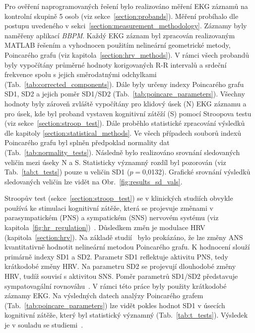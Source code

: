 Pro ověření naprogramovaných řešení bylo realizováno měření EKG záznamů na
kontrolní skupině 5 osob (viz sekce~\ref{section:probands}). Měření probíhalo
dle postupu uvedeného v sekci~\ref{section:measurement_methodology}. Záznamy
byly naměřeny aplikací \textit{BBPM}. Každý EKG záznam byl zpracován
realizovaným MATLAB řešením a vyhodnocen použitím nelineární
geometrické metody, Poincarého grafu (viz kapitola~\ref{section:hrv_methods}). V
rámci všech probandů byly vypočítány průměrné hodnoty korigovaných R-R intervalů
a srdeční frekvence spolu s jejich směrodatnými odchylkami
(Tab.~\ref{tab:corrected_components}). Dále byly určeny indexy Poincarého grafu
SD1, SD2 a jejich poměr SD1/SD2 (Tab.~\ref{tab:poincare_parameters}). Všechny hodnoty byly
zároveň zvláště vypočítány pro klidový úsek (N) EKG záznamu a pro úsek, kde byl
proband vystaven kognitivní zátěží (S) pomocí Stroopova testu (viz
sekce~\ref{section:stroop_test}). Dále proběhlo statistické zpracování výsledků
dle kapitoly \ref{section:statistical_methods}. Ve všech případech souborů
indexů Poincarého grafu byl splněn předpoklad normality dat
(Tab.~\ref{tab:normality_tests}). Následně bylo realizováno srovnání sledovaných
veličin mezi úseky N a S. Statisticky významný rozdíl byl pozorován (viz
Tab.~\ref{tab:t_tests}) pouze u veličin SD1 ($p=$0,0132). Grafické srovnání
výsledků sledovaných veličin lze vidět na Obr.~\ref{fig:results_sd_vals}.

Stroopův test (sekce~\ref{section:stroop_test}) se v klinických studiích obvykle
používá ke stimulaci kognitivní zátěže, která se projevuje změnami v
parasympatickém (PNS) a sympatickém (SNS) nervovém systému (viz
kapitola~\ref{fig:hr_regulation})~\cite{Hoshikawa1997}. Důsledkem změn je
modulace HRV (kapitola~\ref{section:hrv}). Na základě
studií~\cite{Brennan2001,Kamen1996} bylo prokázáno, že lze změny ANS
kvantitativně hodnotit nelineární metodou Poincarého grafu. K hodnocení slouží
primárně indexy SD1 a SD2. Parametr SD1 reflektuje aktivitu PNS, tedy krátkodobé
změny HRV. Na parametru SD2 se projevují dlouhodobé změny HRV, tudíž souvisí s
aktivitou SNS. Poměr parametrů SD1/SD2 představuje sympatovagální
rovnováhu~\cite{Hsu2012,Habib2013,Mazhar2007}. V rámci této práce byly použity
krátkodobé záznamy EKG. Na výsledných datech analýzy Poincarého grafem
(Tab.~\ref{tab:poincare_parameters}) lze vidět pokles hodnot SD1 v úsecích
kognitivní zátěže, který byl statistický významný (Tab.~\ref{tab:t_tests}).
Výsledek je v souladu se
studiemi~\cite{Sebastiano2019,Brugnera2018,Vazan2017,Melillo2011}.




















